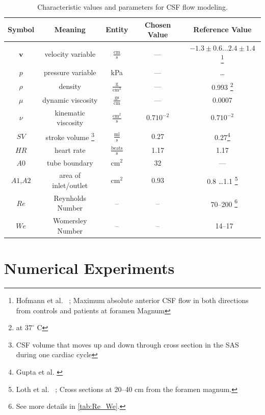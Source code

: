\begin{table}\begin{minipage}{\textwidth}\begin{center}
    \begin{tabular}{ | c | c | c | c | c | }
    \hline
    Symbol & Meaning & Entity & Chosen Value & Reference Value\\ \hline\hline
	$\mathbf{v}$	& velocity variable & $\mathrm{ \frac{cm}{s}}$ & --- & $-1.3\pm 0.6 \ldots 2.4 \pm 1.4$ \footnote{Hofmann et al. ~\cite{Hofmann2000}; Maximum absolute anterior CSF flow in both directions from controls and patients at foramen Magnum} \\ 
	$p$		& pressure	variable & kPa & --- & \ldots\\
	$\rho$	& density & $\mathrm{\frac{g}{cm^3}}$ & --- &0.993 \footnote{at $37^\circ$ C }\\ %
	$\mu$	& dynamic viscosity	&  $\mathrm{\frac{g s}{cm}}$ & --- & 0.0007\\
	$\nu$	& kinematic viscosity & $\mathrm{ \frac{cm^2}{s}}$ & $0.7 10^{-2}$ & $0.7 10^{-2}$ \\ 	\hline %
	$SV$	& stroke volume \footnote{CSF volume that moves up and down through cross section in the SAS during one cardiac cycle}	& $\mathrm{ \frac{ml}{s}}$& $0.27$  & $0.27$\footnote{Gupta et al. \cite{Gupta2009}} \\
	$HR$	& heart rate & $\mathrm{\frac{beats}{s}}$	& 1.17 & 1.17\\
	$A0$	& tube boundary	& $\mathrm{ cm^2}$ & $32$  & ---\\
	$A1$,$A2$	& area of inlet/outlet & $\mathrm{ cm^2}$ &$0.93$ & 0.8 \ldots 1.1 \footnote{Loth et al. ~\cite{Loth2001}; Cross sections at 20--40 cm from the foramen magnum.}  \\
    \hline
    $Re$    & Reynholds Number & -- & -- & ~70--200 \footnote{See more details in \ref{tab:Re_We}.}\\
    $We$    & Womersley Number & -- & -- & ~14--17 \\
    \hline
    \end{tabular}
	\label{tab:entities}
	\caption{Characteristic values and parameters for CSF flow modeling.}
\end{center}\end{minipage}\end{table}

\section{Numerical Experiments} 
